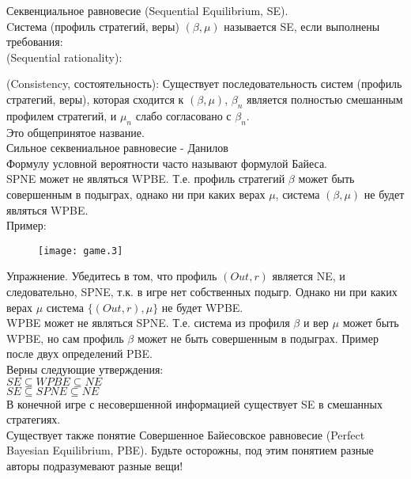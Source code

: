 \documentclass[pdftex,12pt,a4paper]{article}
\begin{document}
Секвенциальное равновесие (Sequential Equilibrium, SE). \\

Cистема (профиль стратегий, веры) $(\beta, \mu)$ называется SE,
если выполнены
требования: \\
(Sequential rationality):

(Consistency, состоятельность): Существует последовательность
систем (профиль стратегий, веры), которая сходится к
$(\beta,\mu)$, $\beta_{n}$ является полностью смешанным профилем
стратегий, и $\mu_{n}$ слабо
согласовано с $\beta_{n}$. \\



Это общепринятое название. \\
Сильное секвениальное равновесие - Данилов \\

Формулу условной вероятности часто называют формулой Байеса. \\

SPNE может не являться WPBE. Т.е. профиль стратегий $\beta$ может
быть совершенным в подыграх, однако ни при каких верах $\mu$,
система $(\beta,\mu)$ не будет являться WPBE. \\
Пример: \\

\begin{figure}[h]
    \texttt{[image: game.3]}
\end{figure}
Упражнение. Убедитесь в том, что профиль $(Out,r)$ является NE, и
следовательно, SPNE, т.к. в игре нет собственных подыгр. Однако ни
при каких верах $\mu$ система $\{(Out,r),\mu\}$ не будет WPBE. \\

WPBE может не являться SPNE. Т.е. система из профиля $\beta$ и вер
$\mu$ может быть WPBE, но сам профиль $\beta$ может не быть
совершенным в подыграх. Пример после двух определений PBE. \\

Верны следующие утверждения: \\
$SE\subseteq WPBE \subseteq NE$ \\
$SE\subseteq SPNE \subseteq NE$ \\
В конечной игре с несовершенной информацией существует SE в
смешанных стратегиях. \\


Существует также понятие Совершенное Байесовское равновесие
(Perfect Bayesian Equilibrium, PBE). Будьте осторожны, под этим
понятием разные авторы подразумевают разные вещи! \\
\end{document}
